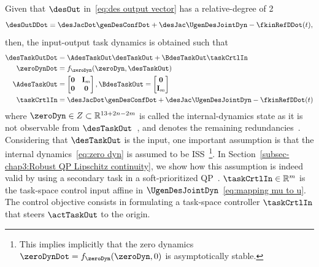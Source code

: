 Given that $\desOut$ in~\cref{eq:des output vector} has a relative-degree of 2
\begin{equation}\label{eq:task relative degree}
	\desOutDDot=  \desJacDot\genDesConfDot + \desJac \UgenDesJointDyn -\fkinRefDDot(t),
\end{equation} 
then, the input-output task dynamics is obtained such that
\begin{align}\label{eq:des task dyn}
	\desTaskOutDot &= \AdesTaskOut\desTaskOut + \BdesTaskOut\taskCrtlIn \\ \label{eq:zero dyn}
	\zeroDynDot &=f_{\zeroDyn}(\zeroDyn,\desTaskOut)\\
		\AdesTaskOut &= \begin{bmatrix}
			\mathbf{0} & \mathbf{I}_m \\ \mathbf{0} & \mathbf{0}
		\end{bmatrix}, \BdesTaskOut = \begin{bmatrix}
			\mathbf{0} \\ \mathbf{I}_m
		\end{bmatrix} \\\label{eq:mapping mu to u}
		\taskCrtlIn &= \desJacDot\genDesConfDot + \desJac \UgenDesJointDyn -\fkinRefDDot(t)%
\end{align}
where $\zeroDyn\in Z\subset\mathbb{R}^{13+2n-2m}$ is called the internal-dynamics state as it is not observable from $\desTaskOut$~\cite{slotine1991applied}, and denotes the remaining redundancies~\cite{varghese1990icse,varghese1991taes}. Considering that $\desTaskOut$ is the input, one important assumption is that the internal dynamics~\cref{eq:zero dyn} is assumed to be ISS~\cite{isidori2013ejc}\footnote{This implies implicitly that the zero dynamics $\zeroDynDot=f_{\zeroDyn}(\zeroDyn,0)$ is asymptotically stable.}. In Section~\ref{subsec-chap3:Robust QP Lipschitz continuity}, we show how this assumption is indeed valid by using a secondary task in a soft-prioritized QP~\cite{long2017bookRedundancyChap5}.
$\taskCrtlIn\in\mathbb{R}^m$ is the task-space control input affine in $\UgenDesJointDyn$~\cref{eq:mapping mu to u}. 
The control objective consists in formulating a task-space controller $\taskCrtlIn$ that steers $\actTaskOut$ to the origin.

